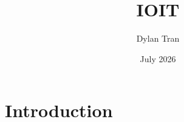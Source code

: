 \documentclass{article}
\title{IOIT}
\author{Dylan Tran}
\date{July 2026}
\begin{document}
\maketitle

\section{Introduction}
\end{document}
